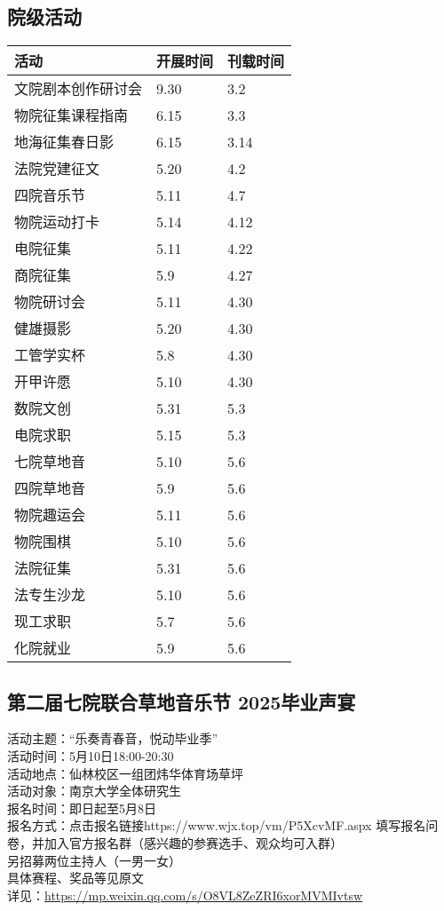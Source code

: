 \documentclass[letterpaper, 12pt]{article}
\begin{document}
\begin{multicols}{2}
\section{院级活动}
\begin{tabular}{|>{\centering\arraybackslash}m{}|m{}|m{}|}
\hline
    活动 & 开展时间 & 刊载时间\\
    \hline\hline
    文院剧本创作研讨会 & 9.30 & 3.2\\
    物院征集课程指南 & 6.15 & 3.3\\
    地海征集春日影 & 6.15 & 3.14\\
    法院党建征文 & 5.20 & 4.2\\
    四院音乐节 & 5.11 & 4.7\\
    物院运动打卡 & 5.14 & 4.12\\
    电院征集 & 5.11 & 4.22\\
    商院征集 & 5.9 & 4.27\\
    物院研讨会 & 5.11 & 4.30\\
    健雄摄影 & 5.20 & 4.30\\
    工管学实杯 & 5.8 & 4.30\\
    开甲许愿 & 5.10 & 4.30\\
    数院文创 & 5.31 & 5.3\\
    电院求职 & 5.15 & 5.3\\
    七院草地音 & 5.10 & 5.6\\
    四院草地音 & 5.9 & 5.6\\
    物院趣运会 & 5.11 & 5.6\\
    物院围棋 & 5.10 & 5.6\\
    法院征集 & 5.31 & 5.6\\
    法专生沙龙 & 5.10 & 5.6\\
    现工求职 & 5.7 & 5.6\\
    化院就业 & 5.9 & 5.6\\
    
    \hline
\end{tabular}
\subsection{第二届七院联合草地音乐节 2025毕业声宴} %
活动主题：“乐奏青春音，悦动毕业季”
\\活动时间：5月10日18:00-20:30
\\活动地点：仙林校区一组团炜华体育场草坪
\\活动对象：南京大学全体研究生
\\报名时间：即日起至5月8日
\\报名方式：点击报名链接https://www.wjx.top/vm/P5XcvMF.aspx 填写报名问卷，并加入官方报名群（感兴趣的参赛选手、观众均可入群）
\\另招募两位主持人（一男一女）
\\具体赛程、奖品等见原文
\\详见：\url{https://mp.weixin.qq.com/s/O8VL8ZeZRI6xorMVMIvtsw}


\end{multicols}
\end{document}
